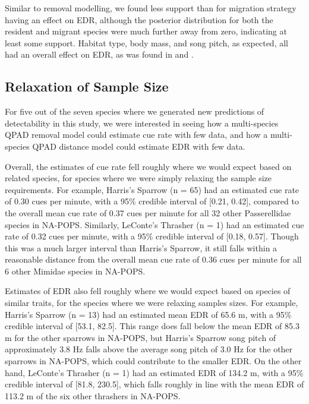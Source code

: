 \documentclass[12pt]{article}
\begin{document}
\par Similar to removal modelling, we found less support than \citet{solymos_phylogeny_2018} for migration strategy having an effect on EDR, although the posterior distribution for both the resident and migrant species were much further away from zero, indicating at least some support.
Habitat type, body mass, and song pitch, as expected, all had an overall effect on EDR, as was found in \citet{solymos_phylogeny_2018} and \cite{johnston_species_2014}.

\subsection{Relaxation of Sample Size}

\par For five out of the seven species where we generated new predictions of detectability in this study, we were interested in seeing how a multi-species QPAD removal model could estimate cue rate with few data, and how a multi-species QPAD distance model could estimate EDR with few data.

\par Overall, the estimates of cue rate fell roughly where we would expect based on related species, for species where we were simply relaxing the sample size requirements.
For example, Harris's Sparrow (n = 65) had an estimated cue rate of 0.30 cues per minute, with a 95\% credible interval of [0.21, 0.42], compared to the overall mean cue rate of 0.37 cues per minute for all 32 other Passerellidae species in NA-POPS.
Similarly, LeConte's Thrasher (n = 1) had an estimated cue rate of 0.32 cues per minute, with a 95\% credible interval of [0.18, 0.57].
Though this was a much larger interval than Harris's Sparrow, it still falls within a reasonable distance from the overall mean cue rate of 0.36 cues per minute for all 6 other Mimidae species in NA-POPS.

\par Estimates of EDR also fell roughly where we would expect based on species of similar traits, for the species where we were relaxing samples sizes.
For example, Harris's Sparrow (n = 13) had an estimated mean EDR of 65.6 m, with a 95\% credible interval of [53.1, 82.5].
This range does fall below the mean EDR of 85.3 m for the other sparrows in NA-POPS, but Harris's Sparrow song pitch of approximately 3.8 Hz falls above the average song pitch of 3.0 Hz for the other sparrows in NA-POPS, which could contribute to the smaller EDR.
On the other hand, LeConte's Thrasher (n = 1) had an estimated EDR of 134.2 m, with a 95\% credible interval of [81.8, 230.5], which falls roughly in line with the mean EDR of 113.2 m of the six other thrashers in NA-POPS.
\end{document}
